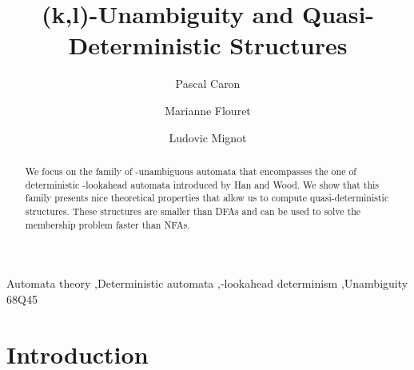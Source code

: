 \documentclass[11pt]{elsarticle}
\newcommand\modif[2]{{#2}}
\begin{document}
 

\begin{frontmatter}

  \title{(k,l)-Unambiguity and Quasi-Deterministic Structures}
  
  \author[rouen]{Pascal Caron}
  \author[lehavre]{Marianne Flouret}
  \author[depart]{Ludovic Mignot} 
  

  \address[rouen]{LITIS, Universit\'e de Rouen, 76801 Saint-\'Etienne du Rouvray Cedex, France}

  \address[lehavre]{LITIS, Universit\'e du Havre, 76058 Le Havre Cedex, France}
    \address[depart]{D\'epartement d'informatique, Universit\'e de Rouen, 76801 Saint-\'Etienne du Rouvray Cedex, France}

  \begin{abstract} 
We focus on the family of -unambi\-guous automata that encompasses the one of deterministic -lookahead automata introduced by Han and Wood.
    We show that this family presents nice theoretical properties that allow us to compute quasi-deterministic structures. 
    These structures are smaller than DFAs and can be used to solve the membership problem faster than NFAs.    
  \end{abstract}
  
	\begin{keyword}
	  Automata theory \sep Deterministic automata \sep -lookahead determinism \sep Unambiguity 
	  \MSC[2010] 68Q45  
	\end{keyword}
\end{frontmatter}



\section{Introduction}\label{se:int}
  \modif{This paper is an extended version of~\cite{CFM14}.}{}
\end{document}
